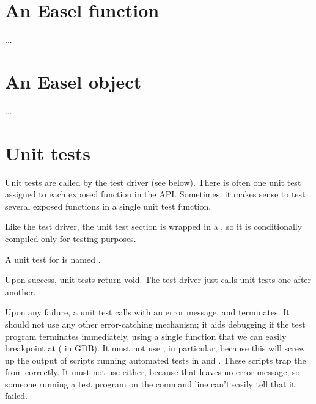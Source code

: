 \section{An Easel function}

...


\section{An Easel object}

...


\section{Unit tests}

Unit tests are called by the test driver (see below). There is often
one unit test assigned to each exposed function in the API. Sometimes,
it makes sense to test several exposed functions in a single unit test
function. 

Like the test driver, the unit test section is wrapped in a
, so it is conditionally compiled only
for testing purposes.

A unit test for  is named . 

Upon success, unit tests return void. The test driver just calls 
unit tests one after another.

Upon any failure, a unit test calls  with an error
message, and terminates. It should not use any other error-catching
mechanism; it aids debugging if the test program terminates
immediately, using a single function that we can easily breakpoint at
( in GDB). It must not use , in
particular, because this will screw up the output of scripts running
automated tests in  and . These
scripts trap the  from  correctly.
It must not use  either, because that leaves no error
message, so someone running a test program on the command line can't
easily tell that it failed.

